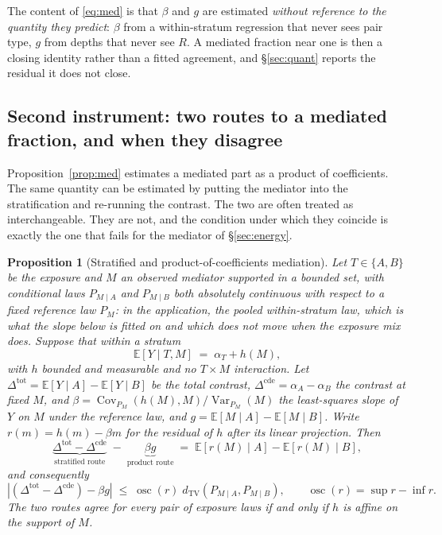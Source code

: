 \documentclass[11pt]{article}
\newtheorem{proposition}{Proposition}
\begin{document}
\noindent The content of \eqref{eq:med} is that $\beta$ and $g$ are estimated \emph{without
reference to the quantity they predict}: $\beta$ from a within-stratum regression that never sees
pair type, $g$ from depths that never see $R$. A mediated fraction near one is then a closing
identity rather than a fitted agreement, and \S\ref{sec:quant} reports the residual it does not
close.

\subsection{Second instrument: two routes to a mediated fraction, and when they disagree}
\label{sec:routes}

Proposition~\ref{prop:med} estimates a mediated part as a product of coefficients. The same
quantity can be estimated by putting the mediator into the stratification and re-running the
contrast. The two are often treated as interchangeable. They are not, and the condition under
which they coincide is exactly the one that fails for the mediator of \S\ref{sec:energy}.

\begin{proposition}[Stratified and product-of-coefficients mediation]
\label{prop:routes}
Let $T\in\{A,B\}$ be the exposure and $M$ an observed mediator supported in a bounded set, with
conditional laws $P_{M\mid A}$ and $P_{M\mid B}$ both absolutely continuous with respect to a fixed
reference law $P_M$: in the application, the pooled within-stratum law, which is what the slope
below is fitted on and which does not move when the exposure mix does. Suppose that within a
stratum
\begin{equation}
\mathbb E\left[Y \mid T,M\right] \;=\; \alpha_T + h(M),
\label{eq:nointeract}
\end{equation}
with $h$ bounded and measurable and no $T\times M$ interaction. Let
$\Delta^{\mathrm{tot}}=\mathbb E[Y\mid A]-\mathbb E[Y\mid B]$ be the total contrast,
$\Delta^{\mathrm{cde}}=\alpha_A-\alpha_B$ the contrast at fixed $M$, and
$\beta = \operatorname{Cov}_{P_M}(h(M),M)/\operatorname{Var}_{P_M}(M)$ the least-squares slope of
$Y$ on $M$ under the reference law, and $g=\mathbb E[M\mid A]-\mathbb E[M\mid B]$. Write $r(m)=h(m)-\beta m$ for the
residual of $h$ after its linear projection. Then
\begin{equation}
\underbrace{\Delta^{\mathrm{tot}}-\Delta^{\mathrm{cde}}}_{\text{stratified route}}
\;-\;\underbrace{\beta g}_{\text{product route}}
\;=\;\mathbb E\!\left[r(M)\mid A\right]-\mathbb E\!\left[r(M)\mid B\right],
\label{eq:routes}
\end{equation}
and consequently
\begin{equation}
\left|\left(\Delta^{\mathrm{tot}}-\Delta^{\mathrm{cde}}\right)-\beta g\right|
\;\le\;\operatorname{osc}(r)\; d_{\mathrm{TV}}\!\left(P_{M\mid A},P_{M\mid B}\right),
\qquad \operatorname{osc}(r)=\sup r-\inf r .
\label{eq:routebound}
\end{equation}
The two routes agree for every pair of exposure laws if and only if $h$ is affine on the support of
$M$.
\end{proposition}
\end{document}
